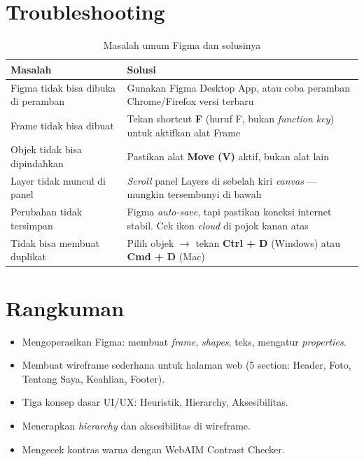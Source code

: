 \section{Troubleshooting}
\label{sec:m02-troubleshoot}

\begin{table}[ht]
\centering
\caption{Masalah umum Figma dan solusinya}
\label{tab:m02-troubleshoot}
\small
\begin{tabular}{p{4.5cm}p{8cm}}
\toprule
\textbf{Masalah} & \textbf{Solusi} \\
\midrule
Figma tidak bisa dibuka di peramban & Gunakan Figma Desktop App, atau coba peramban Chrome/Firefox versi terbaru \\
Frame tidak bisa dibuat & Tekan shortcut \textbf{F} (huruf F, bukan \emph{function key}) untuk aktifkan alat Frame \\
Objek tidak bisa dipindahkan & Pastikan alat \textbf{Move (V)} aktif, bukan alat lain \\
Layer tidak muncul di panel & \emph{Scroll} panel Layers di sebelah kiri \emph{canvas} --- mungkin tersembunyi di bawah \\
Perubahan tidak tersimpan & Figma \emph{auto-save}, tapi pastikan koneksi internet stabil. Cek ikon \emph{cloud} di pojok kanan atas \\
Tidak bisa membuat duplikat & Pilih objek $\rightarrow$ tekan \textbf{Ctrl + D} (Windows) atau \textbf{Cmd + D} (Mac) \\
\bottomrule
\end{tabular}
\end{table}

\section{Rangkuman}
\label{sec:m02-rangkuman}

\begin{itemize}
  \item Mengoperasikan Figma: membuat \emph{frame}, \emph{shapes}, teks, mengatur \emph{properties}.
  \item Membuat wireframe sederhana untuk halaman web (5 section: Header, Foto, Tentang Saya, Keahlian, Footer).
  \item Tiga konsep dasar UI/UX: Heuristik, Hierarchy, Aksesibilitas.
  \item Menerapkan \emph{hierarchy} dan aksesibilitas di wireframe.
  \item Mengecek kontras warna dengan WebAIM Contrast Checker.
\end{itemize}

